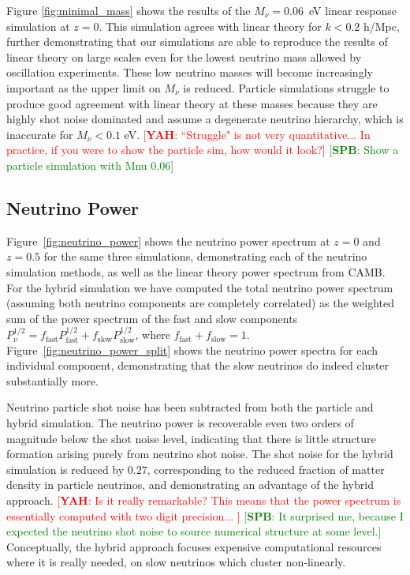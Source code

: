 \documentclass[useAMS, usenatbib]{mnras}
\newcommand{\spb}[1]{{\textcolor{green}{[{\bf SPB}: #1]}}}
\newcommand{\yah}[1]{{\textcolor{red}{[{\bf YAH}: #1]}}}
\begin{document}
Figure \ref{fig:minimal_mass} shows the results of the $M_\nu = 0.06$~eV linear response simulation at $z=0$. This simulation agrees with linear theory for $k < 0.2$ h/Mpc, further demonstrating that our simulations are able to reproduce the results of linear theory on large scales even for the lowest neutrino mass allowed by oscillation experiments. These low neutrino masses will become increasingly important as the upper limit on $M_\nu$ is reduced. Particle simulations struggle to produce good agreement with linear theory at these masses because they are highly shot noise dominated and assume a degenerate neutrino hierarchy, which is inaccurate for $M_\nu < 0.1$ eV. \yah{``Struggle" is not very quantitative... In practice, if you were to show the particle sim, how would it look?} \spb{Show a particle simulation with Mnu 0.06}

\subsection{Neutrino Power}
\label{sec:nupower}

Figure~\ref{fig:neutrino_power} shows the neutrino power spectrum at $z=0$ and $z=0.5$ for the same three simulations, demonstrating each of the neutrino simulation methods, as well as the linear theory power spectrum from CAMB. For the hybrid simulation we have computed the total neutrino power spectrum (assuming both neutrino components are completely correlated) as the weighted sum of the power spectrum of the fast and slow components $P^{1/2}_\nu = f_\mathrm{fast} P^{1/2}_\mathrm{fast} + f_\mathrm{slow} P^{1/2}_\mathrm{slow}$, where $f_\mathrm{fast} + f_\mathrm{slow} = 1$. Figure~\ref{fig:neutrino_power_split} shows the neutrino power spectra for each individual component, demonstrating that the slow neutrinos do indeed cluster substantially more.

Neutrino particle shot noise has been subtracted from both the particle and hybrid simulation. The neutrino power is recoverable even two orders of magnitude below the shot noise level, indicating that there is little structure formation arising purely from neutrino shot noise. The shot noise for the hybrid simulation is reduced by $0.27$, corresponding to the reduced fraction of matter density in particle neutrinos, and demonstrating an advantage of the hybrid approach. \yah{Is it really remarkable? This means that the power spectrum is essentially computed with two digit precision... } \spb{It surprised me, because I expected the neutrino shot noise to source numerical structure at some level.} Conceptually, the hybrid approach focuses expensive computational resources where it is really needed, on slow neutrinos which cluster non-linearly.
\end{document}
